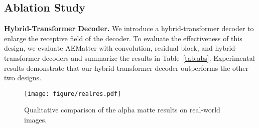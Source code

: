 \documentclass[10pt,twocolumn,letterpaper]{article}
\begin{document}
\subsection{Ablation Study}

\noindent \textbf{Hybrid-Transformer Decoder.}
We introduce a hybrid-transformer decoder to enlarge the receptive field of the decoder. 
To evaluate the effectiveness of this design, we evaluate AEMatter with convolution, residual block, and hybrid-transformer decoders and summarize the results in Table~\ref{tab:abs}. 
Experimental results demonstrate that our hybrid-transformer decoder outperforms the other two designs.

\begin{figure}[!t]
	\texttt{[image: figure/realres.pdf]}
  \vspace{-0.2cm}
	\caption{Qualitative comparison of the alpha matte results on real-world images.  }
 \vspace{-0.2cm}
	\label{fig:real}
\end{figure}


\begin{table}[!t]
  \centering
  \caption{Ablation study on the decoder architecture and additional learning blocks. Decoder denotes the decoder adopted, AL denotes the additional learning block adopted, and AE denotes whether the appearance-enhanced block is used. The additional learning blocks considered are Vanilla, Window, and Axis, representing vanilla self-attention, window attention, and our axis-wise attention, respectively. }
    \vspace{-0.2cm}
  \label{tab:abs}\end{table}
\end{document}
